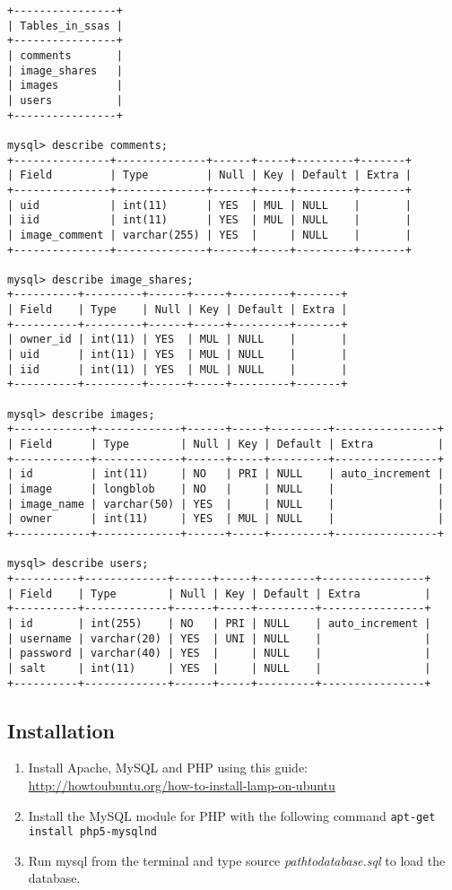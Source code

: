 \documentclass{article}
\begin{document}
\begin{verbatim}
+----------------+
| Tables_in_ssas |
+----------------+
| comments       |
| image_shares   |
| images         |
| users          |
+----------------+

mysql> describe comments;
+---------------+--------------+------+-----+---------+-------+
| Field         | Type         | Null | Key | Default | Extra |
+---------------+--------------+------+-----+---------+-------+
| uid           | int(11)      | YES  | MUL | NULL    |       |
| iid           | int(11)      | YES  | MUL | NULL    |       |
| image_comment | varchar(255) | YES  |     | NULL    |       |
+---------------+--------------+------+-----+---------+-------+

mysql> describe image_shares;
+----------+---------+------+-----+---------+-------+
| Field    | Type    | Null | Key | Default | Extra |
+----------+---------+------+-----+---------+-------+
| owner_id | int(11) | YES  | MUL | NULL    |       |
| uid      | int(11) | YES  | MUL | NULL    |       |
| iid      | int(11) | YES  | MUL | NULL    |       |
+----------+---------+------+-----+---------+-------+

mysql> describe images;
+------------+-------------+------+-----+---------+----------------+
| Field      | Type        | Null | Key | Default | Extra          |
+------------+-------------+------+-----+---------+----------------+
| id         | int(11)     | NO   | PRI | NULL    | auto_increment |
| image      | longblob    | NO   |     | NULL    |                |
| image_name | varchar(50) | YES  |     | NULL    |                |
| owner      | int(11)     | YES  | MUL | NULL    |                |
+------------+-------------+------+-----+---------+----------------+

mysql> describe users;
+----------+-------------+------+-----+---------+----------------+
| Field    | Type        | Null | Key | Default | Extra          |
+----------+-------------+------+-----+---------+----------------+
| id       | int(255)    | NO   | PRI | NULL    | auto_increment |
| username | varchar(20) | YES  | UNI | NULL    |                |
| password | varchar(40) | YES  |     | NULL    |                |
| salt     | int(11)     | YES  |     | NULL    |                |
+----------+-------------+------+-----+---------+----------------+
\end{verbatim}

\subsection{Installation}
\begin{enumerate}
	\item Install Apache, MySQL and PHP using this guide: \url{http://howtoubuntu.org/how-to-install-lamp-on-ubuntu}
	\item Install the MySQL module for PHP with the following command \texttt{apt-get install php5-mysqlnd}
	\item Run mysql from the terminal and type source \emph{pathtodatabase.sql} to load the database.
\end{enumerate}
\end{document}
